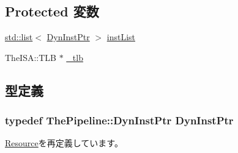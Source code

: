 \subsection*{Protected 変数}
\begin{DoxyCompactItemize}
\item 
\hyperlink{classstd_1_1list}{std::list}$<$ \hyperlink{classRefCountingPtr}{DynInstPtr} $>$ \hyperlink{classTLBUnit_ae10a391d02ce1ef67ee13cd82b7d46e5}{instList}
\item 
TheISA::TLB $\ast$ \hyperlink{classTLBUnit_a5aa23855b427a009f3334c95a146084b}{\_\-tlb}
\end{DoxyCompactItemize}


\subsection{型定義}
\hypertarget{classTLBUnit_af9d0c8a46736ba6aa2d8bb94da1a5e73}{
\subsubsection[{DynInstPtr}]{\setlength{\rightskip}{0pt plus 5cm}typedef {\bf ThePipeline::DynInstPtr} {\bf DynInstPtr}}}
\label{classTLBUnit_af9d0c8a46736ba6aa2d8bb94da1a5e73}


\hyperlink{classResource_af9d0c8a46736ba6aa2d8bb94da1a5e73}{Resource}を再定義しています。

